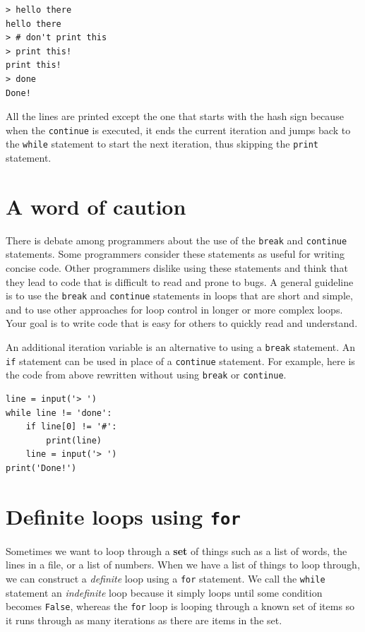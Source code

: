 \beforeverb
\begin{verbatim}
> hello there
hello there
> # don't print this
> print this!
print this!
> done
Done!
\end{verbatim}
\afterverb
%
All the lines are printed except the one that starts with the hash
sign because when the {\tt continue} is executed, it ends 
the current iteration and jumps
back to the {\tt while} statement to start the next iteration, thus 
skipping the {\tt print} statement.

\section{A word of caution}
There is debate among programmers about the use of the {\tt break} and
{\tt continue} statements. Some programmers consider these statements as useful for
writing concise code. Other programmers dislike using these statements and think that
they lead to code that is difficult to read and prone to bugs. A general guideline is
to use the {\tt break} and {\tt continue} statements in loops that are short and simple, 
and to use other approaches for loop control in longer or more complex loops. Your goal 
is to write code that is easy for others to quickly read and understand.

An additional iteration variable is an alternative to using a {\tt break} statement.
An {\tt if} statement can be used in place of a {\tt continue} statement. For example, here 
is the code from above rewritten without using {\tt break} or {\tt continue}.

\beforeverb
\begin{verbatim}
line = input('> ')
while line != 'done':
    if line[0] != '#':
        print(line)
    line = input('> ')
print('Done!')
\end{verbatim}
\afterverb

\section{Definite loops using {\tt for} }

Sometimes we want to loop through a {\bf set} of things such 
as a list of words, the lines in a file, or a list of numbers.
When we have a list of things to loop through, we can
construct a \emph{definite} loop using a {\tt for} statement.
We call the {\tt while} statement an \emph{indefinite} loop
because it simply loops until some condition becomes {\tt False}, 
whereas the {\tt for} loop is looping through a known
set of items so it runs through as many iterations as there
are items in the set.

